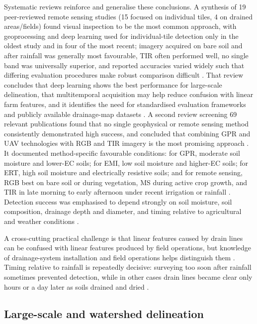 Systematic reviews reinforce and generalise these conclusions. A synthesis of 19 peer-reviewed remote sensing studies (15 focused on individual tiles, 4 on drained areas/fields) found visual inspection to be the most common approach, with geoprocessing and deep learning used for individual-tile detection only in the oldest study and in four of the most recent; imagery acquired on bare soil and after rainfall was generally most favourable, TIR often performed well, no single band was universally superior, and reported accuracies varied widely such that differing evaluation procedures make robust comparison difficult \parencite{Carlsen2024}. That review concludes that deep learning shows the best performance for large-scale delineation, that multitemporal acquisition may help reduce confusion with linear farm features, and it identifies the need for standardised evaluation frameworks and publicly available drainage-map datasets \parencite{Carlsen2024}. A second review screening 69 relevant publications found that no single geophysical or remote sensing method consistently demonstrated high success, and concluded that combining GPR and UAV technologies with RGB and TIR imagery is the most promising approach \parencite{Wienken2024}. It documented method-specific favourable conditions: for GPR, moderate soil moisture and lower-EC soils; for EMI, low soil moisture and higher-EC soils; for ERT, high soil moisture and electrically resistive soils; and for remote sensing, RGB best on bare soil or during vegetation, MS during active crop growth, and TIR in late morning to early afternoon under recent irrigation or rainfall \parencite{Wienken2024}. Detection success was emphasised to depend strongly on soil moisture, soil composition, drainage depth and diameter, and timing relative to agricultural and weather conditions \parencite{Wienken2024}.

A cross-cutting practical challenge is that linear features caused by drain lines can be confused with linear features produced by field operations, but knowledge of drainage-system installation and field operations helps distinguish them \parencite{Allred2020}. Timing relative to rainfall is repeatedly decisive: surveying too soon after rainfall sometimes prevented detection, while in other cases drain lines became clear only hours or a day later as soils drained and dried \parencite{Allred2020}.

\subsection{Large-scale and watershed delineation}

